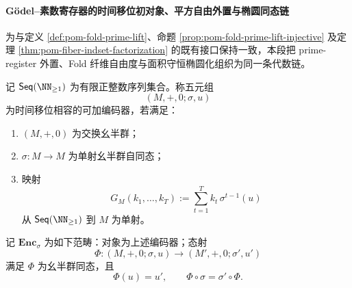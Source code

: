 \paragraph{Gödel--素数寄存器的时间移位初对象、平方自由外置与椭圆同态链}
为与定义 \ref{def:pom-fold-prime-lift}、命题 \ref{prop:pom-fold-prime-lift-injective} 及定理 \ref{thm:pom-fiber-indset-factorization} 的既有接口保持一致，本段把 prime-register 外置、Fold 纤维自由度与面积守恒椭圆化组织为同一条代数链。

\begin{definition}[时间移位相容的可加编码器范畴]\label{def:xi-godel-shift-additive-encoder-category}
记 \(\mathsf{Seq}(\NN_{\ge 1})\) 为有限正整数序列集合。称五元组
\[
(M,+,0;\sigma,u)
\]
为时间移位相容的可加编码器，若满足：
\begin{enumerate}
  \item \((M,+,0)\) 为交换幺半群；
  \item \(\sigma:M\to M\) 为单射幺半群自同态；
  \item 映射
  \[
  G_M(k_1,\dots,k_T):=\sum_{t=1}^T k_t\,\sigma^{t-1}(u)
  \]
  从 \(\mathsf{Seq}(\NN_{\ge 1})\) 到 \(M\) 为单射。
\end{enumerate}
记 \(\mathbf{Enc}_\sigma\) 为如下范畴：对象为上述编码器；态射
\[
\Phi:(M,+,0;\sigma,u)\to(M',+,0;\sigma',u')
\]
满足 \(\Phi\) 为幺半群同态，且
\[
\Phi(u)=u',\qquad \Phi\circ\sigma=\sigma'\circ\Phi.
\]
\end{definition}

